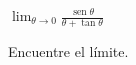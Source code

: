 \item $\displaystyle \lim_{\theta \to 0} \frac{\operatorname{sen} \theta}{\theta + \tan \theta}$
\par
Encuentre el límite.
